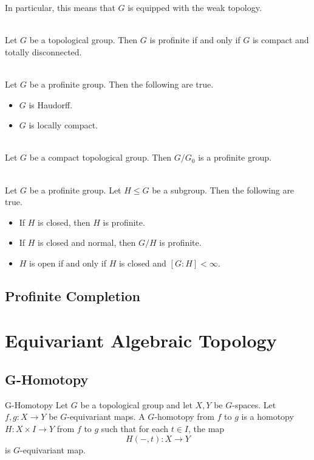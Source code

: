 \documentclass[a4paper]{article}
\begin{document}
In particular, this means that $G$ is equipped with the weak topology. 

\begin{prp}{}{}\\
Let $G$ be a topological group. Then $G$ is profinite if and only if $G$ is compact and totally disconnected. 
\end{prp}

\begin{crl}{}{}\\
Let $G$ be a profinite group. Then the following are true. 
\begin{itemize}
\item $G$ is Haudorff. 
\item $G$ is locally compact. 
\end{itemize}
\end{crl}

\begin{prp}{}{}\\
Let $G$ be a compact topological group. Then $G/G_0$ is a profinite group. 
\end{prp}

\begin{prp}{}{}\\
Let $G$ be a profinite group. Let $H\leq G$ be a subgroup. Then the following are true. 
\begin{itemize}
\item If $H$ is closed, then $H$ is profinite. 
\item If $H$ is closed and normal, then $G/H$ is profinite. 
\item $H$ is open if and only if $H$ is closed and $[G:H]<\infty$. 
\end{itemize}
\end{prp}

\subsection{Profinite Completion}

\pagebreak
\section{Equivariant Algebraic Topology}
\subsection{G-Homotopy}
\begin{defn}{G-Homotopy}{} Let $G$ be a topological group and let $X,Y$ be $G$-spaces. Let $f,g:X\to Y$ be $G$-equivariant maps. A $G$-homotopy from $f$ to $g$ is a homotopy $H:X\times I\to Y$ from $f$ to $g$ such that for each $t\in I$, the map $$H(-,t):X\to Y$$ is $G$-equivariant map. 
\end{defn}
\end{document}
